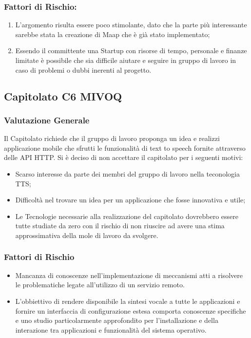 \documentclass[12pt,a4paper]{article}
\begin{document}
\subsubsection{Fattori di Rischio:}
	\begin{enumerate}
\item	L'argomento risulta essere poco stimolante, dato che la parte più interessante sarebbe stata la creazione di Maap che è già stato implementato;

\item	Essendo il committente una Startup con risorse di tempo, personale e	finanze limitate è possibile che sia difficile aiutare e seguire in	gruppo di lavoro in caso di problemi o dubbi inerenti al progetto.
\end{enumerate}


\newpage
\subsection{Capitolato C6 MIVOQ}
\subsubsection{Valutazione Generale}

Il Capitolato richiede che il gruppo di lavoro proponga un idea e realizzi applicazione mobile che sfrutti le funzionalità di text to speech fornite attraverso delle API HTTP.
Si è deciso di non accettare il capitolato per i seguenti motivi:
\begin{itemize}
\item Scarso interesse da parte dei membri del gruppo di lavoro nella teconologia TTS;
\item Difficoltà nel trovare un idea per un applicazione che fosse innovativa e utile;
\item Le Tecnologie necessarie alla realizzazione del capitolato dovrebbero essere tutte studiate da zero con il rischio di non riuscire ad avere una stima approssimativa della mole di lavoro da svolgere.
\end{itemize}

\subsubsection{Fattori di Rischio}

\begin{itemize}
\item Mancanza di conoscenze nell'implementazione di meccanismi atti a risolvere le problematiche legate all'utilizzo di un servizio remoto.
\item L'obbiettivo di rendere disponibile la sintesi vocale a tutte le applicazioni e fornire un interfaccia di configurazione estesa comporta conoscenze specifiche e uno studio particolarmente approfondito per l'installazione e della interazione tra applicazioni e funzionalità del sistema operativo.
\end{itemize}
\end{document}
